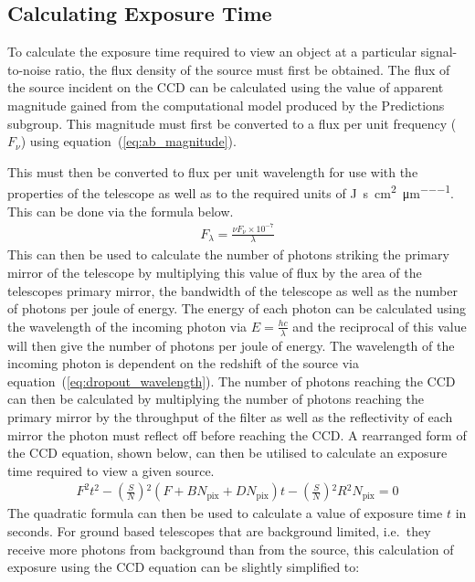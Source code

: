 	\subsection{Calculating Exposure Time} %
	\label{sub:calculating_exposure_time}
		To calculate the exposure time required to view an object at a particular signal-to-noise ratio, the flux density of the source must first be obtained. The flux of the source incident on the CCD can be calculated using the value of apparent magnitude gained from the computational model produced by the Predictions subgroup. This magnitude must first be converted to a flux per unit frequency ($F_\nu$) using equation~(\ref{eq:ab_magnitude}).

		This must then be converted to flux per unit wavelength for use with the properties of the telescope as well as to the required units of \si{\joule\per\second\per\square\centi\metre\per\micro\metre}. This can be done via the formula below. %
		\begin{align}
			F_\lambda = \frac{\nu F_\nu \times 10^{-7}}{\lambda} \label{eq:flux_per_unit_frequency}
		\end{align}
		This can then be used to calculate the number of photons striking the primary mirror of the telescope by multiplying this value of flux by the area of the telescopes primary mirror, the bandwidth of the telescope as well as the number of photons per joule of energy. The energy of each photon can be calculated using the wavelength of the incoming photon via $E = \frac{hc}{\lambda}$ and the reciprocal of this value will then give the number of photons per joule of energy. The wavelength of the incoming photon is dependent on the redshift of the source via equation~(\ref{eq:dropout_wavelength}). The number of photons reaching the CCD can then be calculated by multiplying the number of photons reaching the primary mirror by the throughput of the filter as well as the reflectivity of each mirror the photon must reflect off before reaching the CCD. A rearranged form of the CCD equation, shown below, can then be utilised to calculate an exposure time required to view a given source.
		\begin{align}
			F^2 t^2 - (\frac{S}{N}){^2}(F + BN_\text{pix} + DN_\text{pix})t - (\frac{S}{N}){^2}R{^2}N_\text{pix} = 0
		\end{align}
		The quadratic formula can then be used to calculate a value of exposure time $t$ in seconds. For ground based telescopes that are background limited, i.e.\ they receive more photons from background than from the source, this calculation of exposure using the CCD equation can be slightly simplified to:
